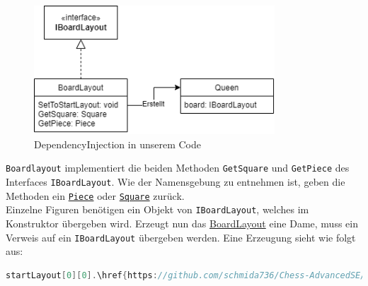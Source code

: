 \documentclass[
10pt, %
a4paper, %
oneside, %
headinclude,footinclude, %
BCOR5mm, %
]{scrartcl}
\begin{document}
\begin{onehalfspace}
\begin{figure}[h]
	\begin{center}
		\includegraphics[width=9cm]{DependencyInjection.png}
		\caption{\label{pic:DependencyInjection}DependencyInjection in unserem Code}
	\end{center}
\end{figure}

\texttt{Boardlayout} implementiert die beiden Methoden \texttt{GetSquare} und \texttt{GetPiece} des Interfaces \texttt{IBoardLayout}. Wie der Namensgebung zu entnehmen ist, geben die Methoden ein \texttt{\href{https://github.com/schmida736/Chess-AdvancedSE/blob/main/Chess-AdvancedSE/Game\%20Elements/Pieces/Piece.cs}{Piece}} oder \texttt{\href{https://github.com/schmida736/Chess-AdvancedSE/blob/main/Chess-AdvancedSE/Game\%20Elements/Square.cs}{Square}} zurück. \\
Einzelne Figuren benötigen ein Objekt von \texttt{IBoardLayout}, welches im Konstruktor übergeben wird. Erzeugt nun das \href{https://github.com/schmida736/Chess-AdvancedSE/blob/main/Chess-AdvancedSE/Game\%20Elements/BoardLayout.cs}{BoardLayout} eine Dame, muss ein Verweis auf ein \texttt{IBoardLayout} übergeben werden. Eine Erzeugung sieht wie folgt aus:

\begin{lstlisting}[language=c, style=mStyle]
startLayout[0][0].\href{https://github.com/schmida736/Chess-AdvancedSE/blob/main/Chess-AdvancedSE/Game\%20Elements/Pieces/Piece.cs}{Piece} = new \href{https://github.com/schmida736/Chess-AdvancedSE/blob/main/Chess-AdvancedSE/Game\%20Elements/Pieces/Queen.cs}{Queen}(player.Color, this);
\end{lstlisting}


\end{onehalfspace}
\end{document}
